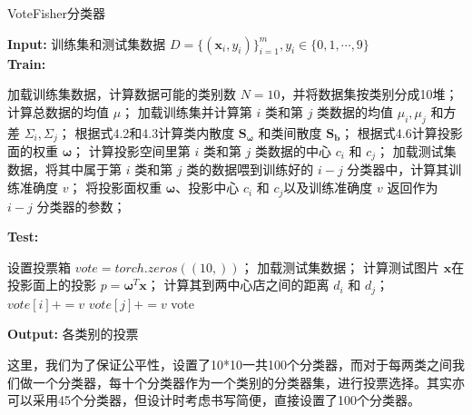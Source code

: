 \documentclass[UTF8, a4paper, 12pt]{report}
\begin{document}
			\begin{algorithm}
			\caption{VoteFisher分类器} %
			\hspace*{0.02in} {\bf Input:} %
			训练集和测试集数据 $D=\{(\bm{x}_i, y_i)\}_{i=1}^{m}, y_i \in \{0, 1, \cdots, 9\}$ \\
			\hspace*{0.02in} {\bf Train:}
			\begin{algorithmic}[1]
			\State 加载训练集数据，计算数据可能的类别数 $N=10$，并将数据集按类别分成10堆； %
					\State 计算总数据的均值 $\mu$；
					\State 加载训练集并计算第 $i$ 类和第 $j$ 类数据的均值 $\mu_i, \mu_j$ 和方差 $\Sigma_i, \Sigma_j$；
					\State 根据式4.2和4.3计算类内散度 $\bm{S}_{\bm{\omega}}$ 和类间散度 $\bm{S}_{\bm{b}}$；
					\State 根据式4.6计算投影面的权重 $\bm{\omega} $；
					\State 计算投影空间里第 $i$ 类和第 $j$ 类数据的中心 $c_i$ 和 $c_j$；
					 \State 加载测试集数据，将其中属于第 $i$ 类和第 $j$ 类的数据喂到训练好的 $i-j$ 分类器中，计算其训练准确度 $v$；
					\State 将投影面权重 $\bm{\omega} $、投影中心 $c_i$ 和 $c_j$以及训练准确度 $v$ 返回作为 $i-j$ 分类器的参数；
				\EndFor
			\EndFor
			\end{algorithmic}
			\hspace*{0.02in} {\bf Test:}
			\begin{algorithmic}[1]
			\State 设置投票箱 $vote=torch.zeros((10, ))$；
			\State 加载测试集数据；
					\State 计算测试图片 $\bm{x}$在投影面上的投影 $p = \bm{\omega}^T \bm{x}$；
					\State 计算其到两中心店之间的距离 $d_i$ 和 $d_j$；
						\State $vote[i] += v$
					\Else
						\State $vote[j] += v$
					\EndIf
				\EndFor
			\EndFor
			\State \Return vote
			\end{algorithmic}
			\hspace*{0.02in} {\bf Output:} %
			各类别的投票
			\end{algorithm}

			这里，我们为了保证公平性，设置了10*10一共100个分类器，而对于每两类之间我们做一个分类器，每十个分类器作为一个类别的分类器集，进行投票选择。其实亦可以采用45个分类器，但设计时考虑书写简便，直接设置了100个分类器。
\end{document}
